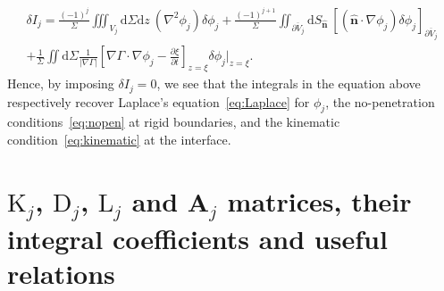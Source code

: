 \documentclass[a4paper]{jpconf}
\newcommand{\unvec}[1]{\bm{\hat{#1}}}
\newcommand{\dd}{\mathrm{d}}
\begin{document}
\begin{multline}
    \delta I_j =\frac{(-1)^{j}}{\Sigma}\iiint_{V_j}\dd\Sigma\dd z~\left(\nabla^2\phi_j\right)\delta\phi_j
    +\frac{(-1)^{j+1}}{\Sigma}\iint_{\overline{\partial V_j}}\dd S_{\unvec{n}}~\left[\left(\unvec{n}\cdot\nabla\phi_j\right)\delta\phi_j\right]_{\overline{\partial V_j}}\\
    +\frac{1}{\Sigma}\iint\dd\Sigma\frac{1}{|\nabla\Gamma|}\left[\nabla\Gamma\cdot\nabla\phi_j-\frac{\partial\xi}{\partial t}\right]_{z=\xi}\delta\phi_j|_{z=\xi}.
\end{multline}
Hence, by imposing $\delta I_j=0$, we see that the integrals in the equation above respectively recover Laplace's equation~\eqref{eq:Laplace} for $\phi_j$, the no-penetration conditions~\eqref{eq:nopen} at rigid boundaries, and the kinematic condition~\eqref{eq:kinematic} at the interface.

\section{$\bm{\mathrm{K}}_j$, $\bm{\mathrm{D}}_j$, $\bm{\mathrm{L}}_j$ and $\mathbf{A}_j$ matrices, their integral coefficients and useful relations}
\label{app:MatrixInt}
\end{document}
